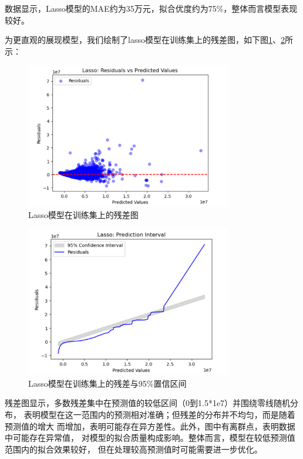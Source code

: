 \documentclass[
    report,     %
    oneside,    %
    UTF8,       %
    zihao=-4    %
]{config} %
\begin{document}
数据显示，Lasso模型的MAE约为35万元，拟合优度约为75\%，整体而言模型表现较好。

为更直观的展现模型，我们绘制了lasso模型在训练集上的残差图，如下图\ref{fig:lasso_residual}、\ref{fig:lasso_residual_interval}所示：

\begin{figure}[H]
    \centering
    \includegraphics[width=0.8\textwidth]{figures/lasso-残差图.png}
    \caption{Lasso模型在训练集上的残差图}
    \label{fig:lasso_residual}
\end{figure}

\begin{figure}[H]
    \centering
    \includegraphics[width=0.8\textwidth]{figures/lasso-置信区间.png}
    \caption{Lasso模型在训练集上的残差与95\%置信区间}
    \label{fig:lasso_residual_interval}
\end{figure}

残差图显示，多数残差集中在预测值的较低区间（0到1.5*1e7）并围绕零线随机分布，
表明模型在这一范围内的预测相对准确；但残差的分布并不均匀，而是随着预测值的增大
而增加，表明可能存在异方差性。此外，图中有离群点，表明数据中可能存在异常值，
对模型的拟合质量构成影响。整体而言，模型在较低预测值范围内的拟合效果较好，
但在处理较高预测值时可能需要进一步优化。
\newpage
\end{document}
